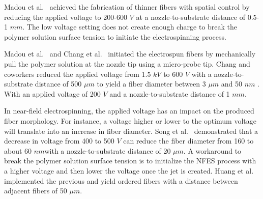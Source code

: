 Madou et al.\unskip~\cite{527120:11973130} achieved the fabrication of thinner fibers with spatial control by reducing the applied voltage to 200-600 $V $  at a nozzle-to-substrate distance of 0.5-1 $mm $. The low voltage setting does not create enough charge to break the polymer solution surface tension to initiate the electrospinning process.

Madou et al.\unskip~\cite{527120:11973130} and Chang et al.\unskip~\cite{527120:11974306} initiated the electrospun fibers by mechanically pull the polymer solution at the nozzle tip using a micro-probe tip. Chang and coworkers reduced the applied voltage from 1.5 $kV $ to 600 $V $ with a nozzle-to-substrate distance of 500 $\mu m $ to yield a fiber diameter between 3 $\mu m $  and 50 $nm $ . With an applied voltage of 200 $V $ and a nozzle-to-substrate distance of 1 $mm $.

In near-field electrospinning, the applied voltage has an impact on the produced fiber morphology. For instance, a voltage higher or lower to the optimum voltage will translate into an increase in fiber diameter. Song et al.\unskip~\cite{527120:11974320} demonstrated that a decrease in voltage from 400 to 500 $V $ can reduce the fiber diameter from 160 to about 60 $nm $with a nozzle-to-substrate distance of 20 $\mu m $. A workaround to break the polymer solution surface tension is to initialize the NFES process with a higher voltage and then lower the voltage once the jet is created. Huang et al.\unskip~\cite{527120:11974311} implemented the previous and yield ordered fibers with a distance between adjacent fibers of 50 $\mu m $.



